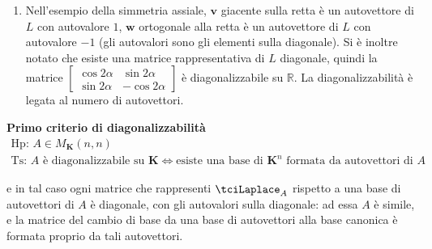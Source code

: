 \documentclass{article}
\begin{document}
\begin{enumerate}
\item Nell'esempio della simmetria assiale, $\mathbf{v}$ giacente sulla
retta \`{e} un autovettore di $L$ con autovalore $1$, $\mathbf{w}$
ortogonale alla retta \`{e} un autovettore di $L$ con autovalore $-1$ (gli
autovalori sono gli elementi sulla diagonale). Si \`{e} inoltre notato che
esiste una matrice rappresentativa di $L$ diagonale, quindi la matrice $%
\left[ 
\begin{array}{cc}
\cos 2\alpha & \sin 2\alpha \\ 
\sin 2\alpha & -\cos 2\alpha%
\end{array}%
\right] $ \`{e} diagonalizzabile su $%
\mathbb{R}
$. La diagonalizzabilit\`{a} \`{e} legata al numero di autovettori.
\end{enumerate}

\textbf{Primo criterio di diagonalizzabilit\`{a}} 
\begin{gather*}
\text{Hp}\text{: }A\in M_{\mathbf{K}}\left( n,n\right) \\
\text{Ts}\text{: }A\text{ \`{e} diagonalizzabile su }\mathbf{K}%
\Longleftrightarrow \text{esiste una base di }\mathbf{K}^{n}\text{ formata
da autovettori di }A
\end{gather*}

e in tal caso ogni matrice che rappresenti $\tciLaplace _{A}$ rispetto a una
base di autovettori di $A$ \`{e} diagonale, con gli autovalori sulla
diagonale: ad essa $A$ \`{e} simile, e la matrice del cambio di base da una
base di autovettori alla base canonica \`{e} formata proprio da tali
autovettori.
\end{document}
